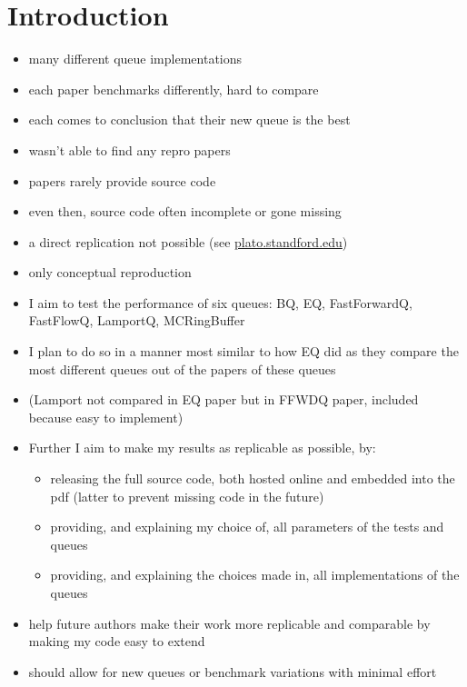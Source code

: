 \section{Introduction}
\begin{itemize}
    \item many different queue implementations
    \item each paper benchmarks differently, hard to compare
    \item each comes to conclusion that their new queue is the best
    \item wasn't able to find any repro papers
    \item papers rarely provide source code
    \item even then, source code often incomplete or gone missing
    \item a direct replication not possible (see
            \href{https://plato.stanford.edu/entries/scientific-reproducibility/#:~:text=direct
                replication%
                conceptual%
                to%
        }{plato.standford.edu})
    \item only conceptual reproduction
    \item I aim to test the performance of six queues: BQ, EQ, FastForwardQ, FastFlowQ, LamportQ, MCRingBuffer
    \item I plan to do so in a manner most similar to how EQ did as they compare the most different
        queues out of the papers of these queues
    \item (Lamport not compared in EQ paper but in FFWDQ paper, included because easy to implement)
    \item Further I aim to make my results as replicable as possible, by:
        \begin{itemize}
            \item releasing the full source code, both hosted online and embedded into the pdf
                (latter to prevent missing code in the future)
            \item providing, and explaining my choice of, all parameters of the tests and queues
            \item providing, and explaining the choices made in, all implementations of the queues
        \end{itemize}
    \item help future authors make their work more replicable and comparable by making my code easy to extend
    \item should allow for new queues or benchmark variations with minimal effort
\end{itemize}

